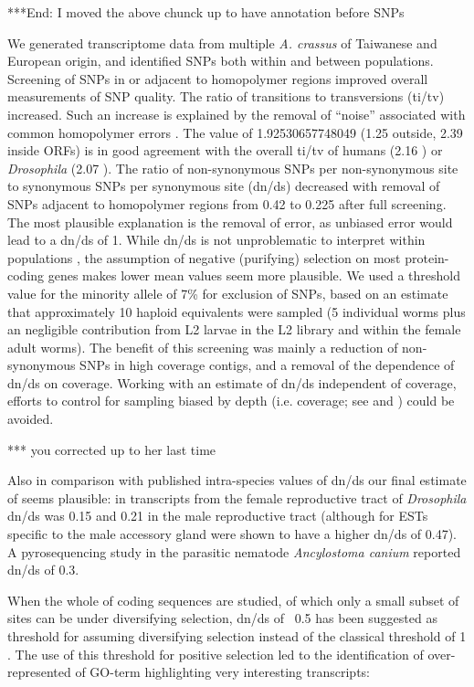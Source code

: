 \documentclass[10pt]{bmc_article}
\newenvironment{bmcformat}{\begin{raggedright}\baselineskip20pt\sloppy\setboolean{publ}{false}}{\end{raggedright}\baselineskip20pt\sloppy}
\begin{document}
\begin{bmcformat}
***End: I moved the above chunck up to have annotation before SNPs

We generated transcriptome data from multiple \textit{A. crassus} of
Taiwanese and European origin, and identified SNPs both within and
between populations. Screening of SNPs in or adjacent to homopolymer
regions improved overall measurements of SNP quality. The ratio of
transitions to transversions (ti/tv) increased. Such an increase is
explained by the removal of “noise” associated with common homopolymer
errors \cite{pmid21685085}. The value of 1.92530657748049
(1.25 outside, 2.39 inside
ORFs) is in good agreement with the overall ti/tv of humans (2.16
\cite{pmid21169219}) or \textit{Drosophila} (2.07
\cite{pmid21143862}). The ratio of non-synonymous SNPs per
non-synonymous site to synonymous SNPs per synonymous site (dn/ds)
decreased with removal of SNPs adjacent to homopolymer regions from
0.42 to 0.225 after
full screening. The most plausible explanation is the removal of
error, as unbiased error would lead to a dn/ds of 1. While dn/ds is
not unproblematic to interpret within populations \cite{pmid19081788},
the assumption of negative (purifying) selection on most
protein-coding genes makes lower mean values seem more plausible. We
used a threshold value for the minority allele of 7\% for exclusion of
SNPs, based on an estimate that approximately 10 haploid equivalents
were sampled (5 individual worms plus an negligible contribution from
L2 larvae in the L2 library and within the female adult worms). The
benefit of this screening was mainly a reduction of non-synonymous
SNPs in high coverage contigs, and a removal of the dependence of
dn/ds on coverage. Working with an estimate of dn/ds independent of
coverage, efforts to control for sampling biased by depth
(i.e. coverage; see \cite{pmid18590545} and \cite{pmid20478048}) could
be avoided.

*** you corrected up to her last time

Also in comparison with published intra-species values of dn/ds our
final estimate of seems plausible: in transcripts from the female
reproductive tract of \textit{Drosophila} dn/ds was 0.15
\cite{pmid15579698} and 0.21 in the male reproductive tract
\cite{pmid11404480} (although for ESTs specific to the male accessory
gland were shown to have a higher dn/ds of 0.47). A pyrosequencing
study in the parasitic nematode \textit{Ancylostoma canium}
\cite{pmid20470405} reported dn/ds of 0.3.

When the whole of coding sequences are studied, of which only a small
subset of sites can be under diversifying selection, dn/ds of ~0.5 has
been suggested as threshold for assuming diversifying selection
\cite{pmid15579698} instead of the classical threshold of 1
\cite{pmid6449605}. The use of this threshold for positive selection
led to the identification of over-represented of GO-term highlighting
very interesting transcripts:


\end{bmcformat}
\end{document}
